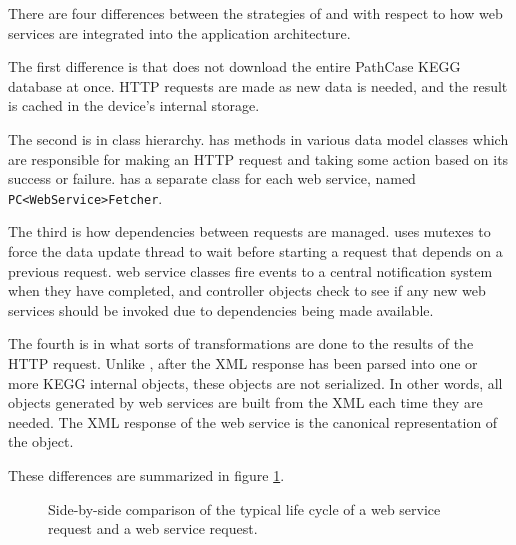 There are four differences between the strategies of \mawapp and \keggapp
with respect to how web services are integrated into the application
architecture.

The first difference is that \keggapp does not download the entire PathCase
KEGG database at once. HTTP requests are made as new data is needed, and the
result is cached in the device's internal storage.

The second is in class hierarchy. \mawapp has methods in various data model
classes which are responsible for making an HTTP request and taking some action
based on its success or failure. \keggapp has a separate class for each web
service, named \texttt{PC<WebService>Fetcher}.

The third is how dependencies between requests are managed. \mawapp uses
mutexes to force the data update thread to wait before starting a request that
depends on a previous request. \keggappp web service classes fire events to
a central notification system when they have completed, and controller objects
check to see if any new web services should be invoked due to dependencies being
made available.

The fourth is in what sorts of transformations are done to the results of the
HTTP request. Unlike \mawapp, after the XML response has been parsed into
one or more KEGG internal objects, these objects are not serialized. In other
words, all objects generated by web services are built from the XML each time
they are needed. The XML response of the web service is the canonical
representation of the object.

These differences are summarized in figure
\ref{fig:kegg_impl_web_service_differences}.

\begin{figure}[hbt]
    \caption{\label{fig:kegg_impl_web_service_differences} Side-by-side
    comparison of the typical life cycle of a \keggapp web service request and
    a \mawapp web service request.}
\end{figure}

